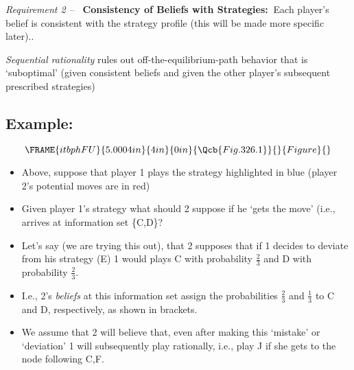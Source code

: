 \documentclass{article}
\begin{document}
\bigskip

\textit{Requirement 2 -- }\textbf{\ Consistency of Beliefs with Strategies: }%
$\ $Each player's belief is consistent with the strategy profile (this will
be made more specific later)..

\bigskip

\textit{Sequential rationality} rules out off-the-equilibrium-path behavior
that is `suboptimal' (given consistent beliefs and given the other player's
subsequent prescribed strategies)

\bigskip 

\subsection{Example:}

\begin{equation}
\FRAME{itbphFU}{5.0004in}{4in}{0in}{\Qcb{Fig. 326.1}}{}{Figure}{\special%
{language "Scientific Word";type "GRAPHIC";maintain-aspect-ratio
TRUE;display "USEDEF";valid_file "T";width 5.0004in;height 4in;depth
0in;original-width 5.3599in;original-height 4.4317in;cropleft "0";croptop
"1";cropright "1";cropbottom "0";tempfilename
'JSH9C61Y.wmf';tempfile-properties "XPR";}}
\end{equation}

\begin{itemize}
\item Above, suppose that player 1 plays the strategy highlighted in blue
(player 2's potential moves are in red)

\item Given player 1's strategy what should 2 suppose if he `gets the move'
(i.e., arrives at information set \{C,D\}?

\item Let's say (we are trying this out), that 2 supposes that if 1 decides
to deviate from his strategy (E) 1 would plays C with probability $\frac{2}{3%
}$ and D with probability $\frac{2}{3}$.

\item I.e., 2's \textit{beliefs} at this information set assign the
probabilities $\frac{2}{3}$ and $\frac{1}{3}$ to C and D, respectively, as
shown in brackets.

\item We assume that 2 will believe that, even after making this `mistake'
or `deviation' 1 will subsequently play rationally, i.e., play J if she gets
to the node following C,F.
\end{itemize}
\end{document}
